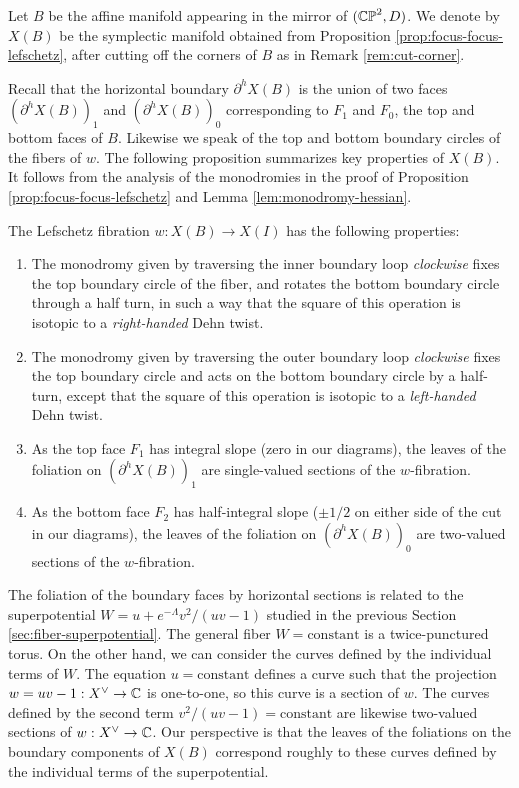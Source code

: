 \documentclass[12pt]{amsart}
\begin{document}
 
  \begin{definition}
    Let $B$ be the affine manifold appearing in the mirror of $(\mathbb{CP}^2,D)$. We denote by $X(B)$ be the symplectic manifold obtained from Proposition \ref{prop:focus-focus-lefschetz}, after cutting off the corners of $B$ as in Remark \ref{rem:cut-corner}.
  \end{definition}
  
Recall that the horizontal boundary $\partial^h X(B)$ is the union
of two faces $(\partial^h X(B))_1$ and $(\partial^h X(B))_0$
corresponding to $F_1$ and $F_0$, the top and bottom faces of
$B$. Likewise we speak of the top and bottom boundary circles of the fibers of $w$. The following proposition summarizes key properties of $X(B)$. It follows from the analysis of the monodromies in the proof of Proposition \ref{prop:focus-focus-lefschetz} and Lemma \ref{lem:monodromy-hessian}.
\begin{proposition}
  \label{prop:key-properties}
  The Lefschetz fibration $w : X(B) \to X(I)$ has the following properties:
  \begin{enumerate}
  \item  The monodromy given by traversing the inner boundary loop \emph{clockwise} fixes the top boundary circle of the fiber, and rotates the bottom boundary circle through a half turn, in such a way that the square of this operation is isotopic to a \emph{right-handed} Dehn twist.
  \item The monodromy given by traversing the outer boundary loop \emph{clockwise} fixes the top boundary circle and acts on the bottom boundary circle by a half-turn, except that the square of this operation is isotopic to a \emph{left-handed} Dehn twist.
\item As the top face $F_1$ has integral slope (zero in our diagrams), the leaves of the foliation on $(\partial^h
X(B))_1$ are single-valued sections of the $w$-fibration. 
\item As the bottom face $F_2$ has half-integral slope ($\pm 1/2$ on either side of the cut in our diagrams), the leaves of
the foliation on $(\partial^h X(B))_0$ are two-valued sections of the
$w$-fibration.
  \end{enumerate}
\end{proposition}

\begin{remark}
  \label{rem:leaves-W}
  The foliation of the boundary faces by horizontal sections is related to the superpotential $W= u +e^{-\Lambda}v^2/(uv-1)$ studied in the previous Section \ref{sec:fiber-superpotential}. The general fiber $W = \text{constant}$ is a twice-punctured torus. On the other hand, we can consider the curves defined by the individual terms of $W$. The equation $u = \text{constant}$ defines a curve such that the projection $w = uv-1: X^\vee \to \mathbb{C}$ is one-to-one, so this curve is a section of $w$. The curves defined by the second term $v^2/(uv-1) = \text{constant}$ are likewise two-valued sections of $w: X^\vee \to \mathbb{C}$. Our perspective is that the leaves of the foliations on the boundary components of $X(B)$ correspond roughly to these curves defined by the individual terms of the superpotential. 
\end{remark}
\end{document}

